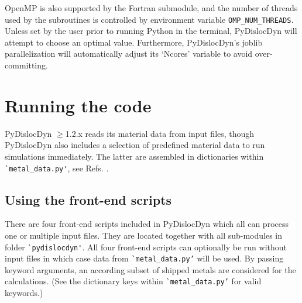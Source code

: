 \documentclass[11pt,letterpaper,oneside,pdftex]{article}
\begin{document}
\begin{itemize}
OpenMP is also supported by the Fortran submodule, and the number of threads used by the subroutines is controlled by environment variable \verb|OMP_NUM_THREADS|.
Unless set by the user prior to running Python in the terminal, PyDislocDyn will attempt to choose an optimal value.
Furthermore, PyDislocDyn’s joblib parallelization will automatically adjust its ‘Ncores’ variable to avoid over-committing.
\end{itemize}


\section{Running the code}

PyDislocDyn $\ge$1.2.x reads its material data from input files, though PyDislocDyn also includes a selection of predefined material data to run simulations immediately.
The latter are assembled in dictionaries within \verb|`metal_data.py'|, see Refs. \cite{Hertzberg:2012,Kaye:2004,CRCHandbook,Wasserbaech:1990,Seeger:1960,Graham:1968,Smith:1966,Kiewel:1996,Samsonov:1968,Epstein:1965,Lowrie:1967,Thomas:1968,Hiki:1966,Leese:1968,Voronov:1978,Alers:1960,Saunders:1986,Powell:1984,Naimon:1971,Riley:1973,Swartz:1972,Rao:1973,Swartz:1970,Singh:1992,Barrera:1993,Jiles:1981,Yogurtcu:1985,Srinivasan:1973a,Rao:1980,Vekilov:2016,Suzuki:1971}.

\subsection{Using the front-end scripts}
\label{sec:frontends}

There are four front-end scripts included in PyDislocDyn which all can process one or multiple input files.
They are located together with all sub-modules in folder \verb|`pydislocdyn'|.
All four front-end scripts can optionally be run without input files in which case data from \verb|`metal_data.py’| will be used.
By passing keyword arguments, an according subset of shipped metals are considered for the calculations.
(See the dictionary keys within \verb|`metal_data.py’| for valid keywords.)
\end{document}
